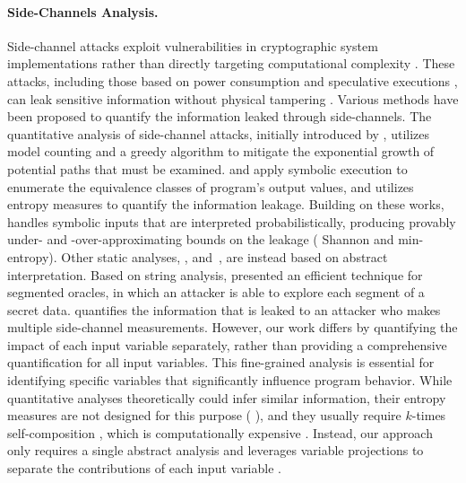 \paragraph{Side-Channels Analysis.}
Side-channel attacks exploit vulnerabilities in cryptographic system implementations rather than directly targeting computational complexity .
These attacks, including those based on power consumption  and speculative executions , can leak sensitive information without physical tampering .
Various methods have been proposed to quantify the information leaked through side-channels.
The quantitative analysis of side-channel attacks, initially introduced by , utilizes model counting and a greedy algorithm to mitigate the exponential growth of potential paths that must be examined.
 and  apply symbolic execution to enumerate the equivalence classes of program's output values, and utilizes entropy measures to quantify the information leakage.
Building on these works,  handles symbolic inputs that are interpreted probabilistically, producing provably under- and -over-approximating bounds on the leakage (\wrt{} Shannon and min-entropy).
Other static analyses, \eg,  and~, are instead based on abstract interpretation.
Based on string analysis,  presented an efficient technique for segmented oracles, in which an attacker is able to explore each segment of a secret data.
 quantifies the information that is leaked to an attacker who makes multiple side-channel measurements.
However, our work differs by quantifying the impact of each input variable separately, rather than providing a comprehensive quantification for all input variables.
This fine-grained analysis is essential for identifying specific variables that significantly influence program behavior.
While quantitative analyses theoretically could infer similar information, their entropy measures are not designed for this purpose (\cf{} ), and they usually require $k$-times self-composition , which is computationally expensive .
Instead, our approach only requires a single abstract analysis and leverages variable projections to separate the contributions of each input variable .


